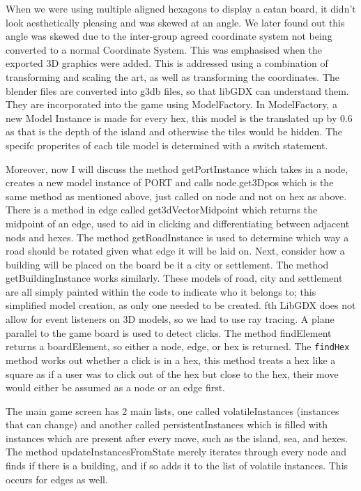 \documentclass[a4paper,doc]{apa6}
\newcommand{\code}{\texttt}
\begin{document}
When we were using multiple aligned hexagons to display a catan board, it didn’t look aesthetically pleasing and was skewed at an angle. We later found out this angle was skewed due to the inter-group agreed coordinate system not being converted to a normal Coordinate System. This was emphasised when the exported 3D graphics were added. This is addressed using a combination of transforming and scaling the art, as well as transforming the coordinates. The blender files are converted into g3db files, so that libGDX can understand them. They are incorporated into the game using ModelFactory. In ModelFactory, a new Model Instance is made for every hex, this model is the translated up by 0.6 as that is the depth of the island and otherwise the tiles would be hidden. The specifc properites of each tile model is determined with a switch statement. 

Moreover, now I will discuss the method getPortInstance which takes in a node, creates a new model instance of PORT and calls node.get3Dpos which is the same method as mentioned above, just called on node and not on hex as above. There is a method in edge called get3dVectorMidpoint which returns the midpoint of an edge, used to aid in clicking and differentiating between adjacent nods and hexes. The method getRoadInstance is used to determine which way a road should be rotated given what edge it will be laid on. Next, consider how a building will be placed on the board be it a city or settlement. The method getBuildingInstance works similarly. These models of road, city and settlement are all simply painted within the code to indicate who it belongs to; this simplified model creation, as only one needed to be created. 
fth
LibGDX does not allow for event listeners on 3D models, so we had to use ray tracing. A plane parallel to the game board is used to detect clicks. The method findElement returns a boardElement, so either a node, edge, or hex is returned. The \code{findHex} method works out whether a click is in a hex, this method treats a hex like a square as if a user was to click out of the hex but close to the hex, their move would either be assumed as a node or an edge first. 

The main game screen has 2 main lists, one called volatileInstances (instances that can change) and another called persistentInstances which is filled with instances which are present after every move, such as the island, sea, and hexes. The method updateInstancesFromState merely iterates through every node and finds if there is a building, and if so adds it to the list of volatile instances. This occurs for edges as well. 
\end{document}
